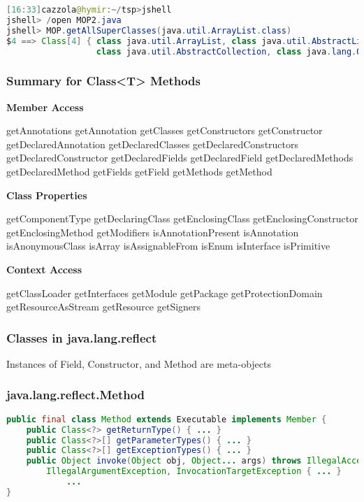 \begin{lstlisting}[language=Java]
[16:33]cazzola@hymir:~/tsp>jshell
jshell> /open MOP2.java
jshell> MOP.getAllSuperClasses(java.util.ArrayList.class)
$4 ==> Class[4] { class java.util.ArrayList, class java.util.AbstractList,
                  class java.util.AbstractCollection, class java.lang.Object }
\end{lstlisting}

\subsubsection{Summary for Class<T> Methods}

\textbf{Member Access}

getAnnotations
getAnnotation
getClasses
getConstructors
getConstructor
getDeclaredAnnotation
getDeclaredClasses
getDeclaredConstructors
getDeclaredConstructor
getDeclaredFields
getDeclaredField
getDeclaredMethods
getDeclaredMethod
getFields
getField
getMethods
getMethod

\textbf{Class Properties}

getComponentType
getDeclaringClass
getEnclosingClass
getEnclosingConstructor
getEnclosingMethod
getModifiers
isAnnotationPresent
isAnnotation
isAnonymousClass
isArray
isAssignableFrom
isEnum
isInterface
isPrimitive

\textbf{Context Access}

getClassLoader
getInterfaces
getModule
getPackage
getProtectionDomain
getResourceAsStream
getResource
getSigners

\subsubsection{Classes in java.lang.reflect}


Instances of Field, Constructor, and Method are meta-objects

\subsubsection{java.lang.reflect.Method}

\begin{lstlisting}[language=Java]
public final class Method extends Executable implements Member {
	public Class<?> getReturnType() { ... }
	public Class<?>[] getParameterTypes() { ... }
	public Class<?>[] getExceptionTypes() { ... }
	public Object invoke(Object obj, Object... args) throws IllegalAccessException,
		IllegalArgumentException, InvocationTargetException { ... }
			...
}
\end{lstlisting}


